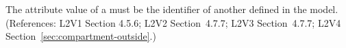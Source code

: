 The  attribute value of a \Compartment must be the identifier of
another \Compartment defined in the model.  (References: L2V1 Section
4.5.6; L2V2 Section~4.7.7; L2V3 Section~4.7.7; L2V4 Section~\ref{sec:compartment-outside}.)
